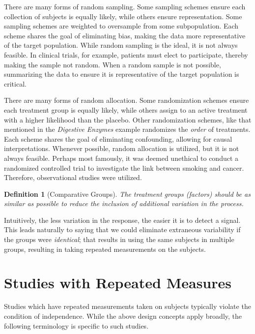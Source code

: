 \documentclass[
]{book}
\theoremstyle{plain}
\theoremstyle{mydefn}
\newtheorem{definition}{Definition}[chapter]
\theoremstyle{myexmpl}
\theoremstyle{remark}
\begin{document}
There are many forms of random sampling. Some sampling schemes ensure each collection of subjects is equally likely, while others ensure representation. Some sampling schemes are weighted to oversample from some subpopulation. Each scheme shares the goal of eliminating bias, making the data more representative of the target population. While random sampling is the ideal, it is not always feasible. In clinical trials, for example, patients must elect to participate, thereby making the sample not random. When a random sample is not possible, summarizing the data to ensure it is representative of the target population is critical.

There are many forms of random allocation. Some randomization schemes ensure each treatment group is equally likely, while others assign to an active treatment with a higher likelihood than the placebo. Other randomization schemes, like that mentioned in the \emph{Digestive Enzymes} example randomizes the \emph{order} of treatments. Each scheme shares the goal of eliminating confounding, allowing for causal interpretations. Whenever possible, random allocation is utilized, but it is not always feasible. Perhaps most famously, it was deemed unethical to conduct a randomized controlled trial to investigate the link between smoking and cancer. Therefore, observational studies were utilized.

\begin{definition}[Comparative Groups]
The treatment groups (factors) should be as similar as possible to reduce the inclusion of additional variation in the process.
\end{definition}

Intuitively, the less variation in the response, the easier it is to detect a signal. This leads naturally to saying that we could eliminate extraneous variability if the groups were \emph{identical}; that results in using the same subjects in multiple groups, resulting in taking repeated measurements on the subjects.

\hypertarget{studies-with-repeated-measures}{%
\section{Studies with Repeated Measures}\label{studies-with-repeated-measures}}

Studies which have repeated measurements taken on subjects typically violate the condition of independence. While the above design concepts apply broadly, the following terminology is specific to such studies.
\end{document}
